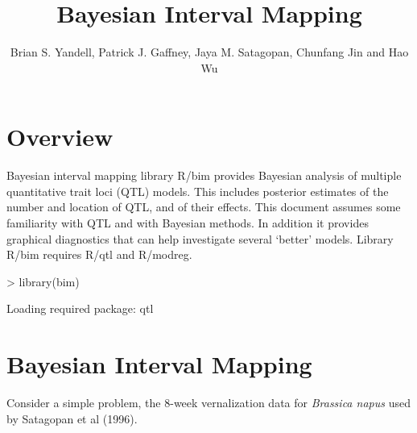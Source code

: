 \documentclass{article}
\begin{document}
\title{Bayesian Interval Mapping}
\author{Brian S. Yandell, Patrick J. Gaffney, Jaya M. Satagopan, Chunfang Jin and Hao Wu} 
\maketitle

\section{Overview}
Bayesian interval mapping library R/bim provides Bayesian analysis of
multiple quantitative trait loci (QTL) models. This includes posterior
estimates of the number and location of QTL, and of their
effects. This document assumes some familiarity with QTL and with
Bayesian methods. In
addition it provides graphical diagnostics that can help investigate
several `better' models. Library R/bim requires R/qtl and R/modreg.

\begin{Schunk}
\begin{Sinput}
> library(bim)
\end{Sinput}
\begin{Soutput}
Loading required package: qtl 
\end{Soutput}
\end{Schunk}

\section{Bayesian Interval Mapping}

Consider a simple problem, the 8-week vernalization data for {\em
Brassica napus}  used by Satagopan et al (1996).
\end{document}
